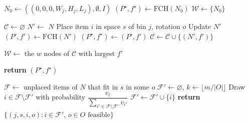 \begin{algorithm}
\caption{Beam Search for the MHKP}
\label{alg:bs3d}
\small
\setlength{\baselineskip}{10pt}
\begin{algorithmic}[1]


    \State $N_0 \gets ((0,0,0,W_j,H_j,L_j), \emptyset, I)$ 
    \State $(P^\star, f^\star) \gets \text{FCH}(N_0)$
    \State $\mathcal{W} \gets \{N_0\}$


        \State $\mathcal{C} \gets \varnothing$
                \State $N' \gets$ $N$
                \State Place item $i$ in space $s$ of bin $j$, rotation $o$
                \State Update $N'$
                \State $(P', f') \gets \text{FCH}(N')$
                    \State $(P^\star, f^\star) \gets (P', f')$
                \EndIf
                \State $\mathcal{C} \gets \mathcal{C} \cup \{(N', f')\}$
            \EndFor
        \EndFor

        \State $\mathcal{W} \gets$ the $w$ nodes of $\mathcal{C}$ with largest $f'$

    \EndWhile

    \State \textbf{return} $(P^\star, f^\star)$

\EndProcedure

\Statex


        \State $\mathcal{F} \gets$ unplaced items of $N$ that fit in $s$ in some $o$
                \State $\mathcal{F}' \gets \varnothing$,
                       \quad $k \gets \lfloor m/|O| \rfloor$
                    \State Draw $i \in \mathcal{F} \setminus \mathcal{F}'$ with
                           probability $\dfrac{v_i}
                           {\sum_{i' \in \mathcal{F} \setminus \mathcal{F}'} v_{i'}}$
                    \State $\mathcal{F}' \gets \mathcal{F}' \cup \{i\}$
                \EndWhile
                \State \textbf{return} $\{(j,s,i,o) : i \in \mathcal{F}',\, o \in O \text{ feasible}\}$
            \EndIf
        \EndFor
    \EndFor


\end{algorithmic}
\end{algorithm}
